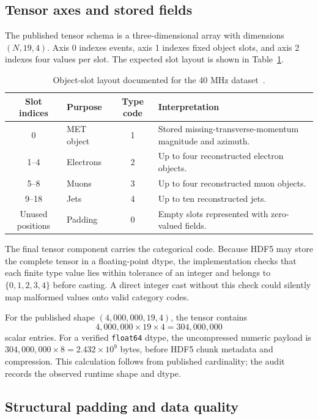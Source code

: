 \documentclass[11pt,a4paper]{article}
\begin{document}
\subsection{Tensor axes and stored fields}

The published tensor schema is a three-dimensional array with dimensions \((N,19,4)\). Axis 0 indexes events, axis 1 indexes fixed object slots, and axis 2 indexes four values per slot. The expected slot layout is shown in Table~\ref{tab:slots}.

\begin{table}[H]\centering
\caption{Object-slot layout documented for the 40 MHz dataset~\cite{govorkova2022lhc}.}\label{tab:slots}
\begin{tabularx}{\textwidth}{c l c X}\toprule
Slot indices & Purpose & Type code & Interpretation \\\midrule
0 & MET object & 1 & Stored missing-transverse-momentum magnitude and azimuth. \\
1--4 & Electrons & 2 & Up to four reconstructed electron objects. \\
5--8 & Muons & 3 & Up to four reconstructed muon objects. \\
9--18 & Jets & 4 & Up to ten reconstructed jets. \\
Unused positions & Padding & 0 & Empty slots represented with zero-valued fields. \\\bottomrule
\end{tabularx}\end{table}

The final tensor component carries the categorical code. Because HDF5 may store the complete tensor in a floating-point dtype, the implementation checks that each finite type value lies within tolerance of an integer and belongs to \(\{0,1,2,3,4\}\) before casting. A direct integer cast without this check could silently map malformed values onto valid category codes.

For the published shape \((4{,}000{,}000,19,4)\), the tensor contains
\begin{equation}4{,}000{,}000\times19\times4=304{,}000{,}000\label{eq:scalarcount}\end{equation}
scalar entries. For a verified \texttt{float64} dtype, the uncompressed numeric payload is \(304{,}000{,}000\times8=2.432\times10^9\) bytes, before HDF5 chunk metadata and compression. This calculation follows from published cardinality; the audit records the observed runtime shape and dtype.

\subsection{Structural padding and data quality}
\end{document}
